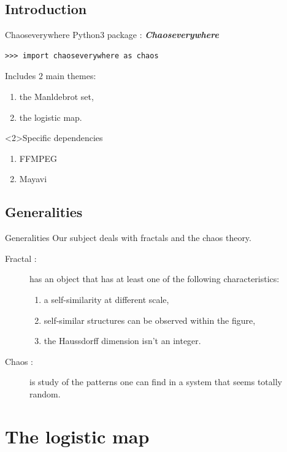 \documentclass[11pt, compress,tikz]{beamer}
\theoremstyle{definition}
\begin{document}
\subsection{Introduction}
\begin{frame}[fragile]{Chaoseverywhere}
Python3 package : \textit{\textbf{Chaoseverywhere}}%
\begin{verbatim}
>>> import chaoseverywhere as chaos
\end{verbatim}
Includes $2$ main themes:
\begin{enumerate}[label=$\bullet$]
    \item the Manldebrot set,  %
    \item the logistic map. %
\end{enumerate}
\begin{block}<2>{Specific dependencies}
\begin{enumerate}[label=\ding{51}]
\item FFMPEG
\item Mayavi
\end{enumerate}
\end{block}
\end{frame}

\subsection{Generalities}
\begin{frame}[fragile]{Generalities}
Our subject deals with fractals and the chaos theory.
\begin{description}
   \item [Fractal :] has an object that has at least one of the following characteristics:
    \begin{enumerate}[label=$\bullet$]
        \item a self-similarity at different scale,
        \item self-similar structures can be observed within the figure,
        \item the Haussdorff dimension isn't an integer.
    \end{enumerate}
    \item [Chaos :] is study of the patterns one can find in a system that seems totally random.
\end{description}
\end{frame}

\section[Logistic map]{The logistic map}
\end{document}
